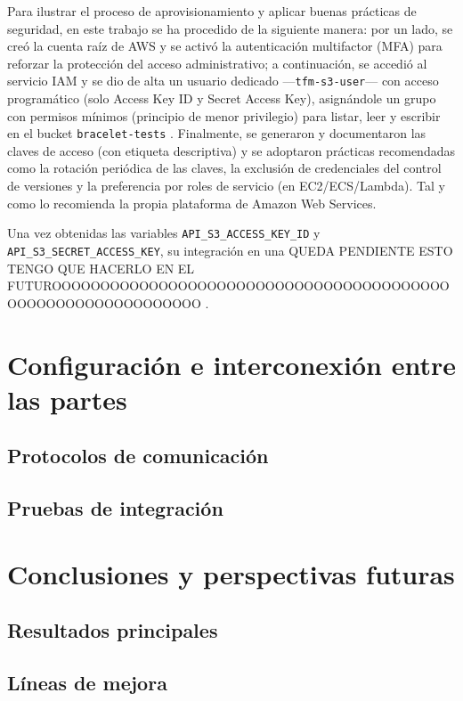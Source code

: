 \documentclass[12pt, a4paper]{article}
\begin{document}
	Para ilustrar el proceso de aprovisionamiento y aplicar buenas prácticas de seguridad, en este trabajo se ha procedido de la siguiente manera: por un lado, se creó la cuenta raíz de AWS y se activó la autenticación multifactor (MFA) para reforzar la protección del acceso administrativo; a continuación, se accedió al servicio IAM y se dio de alta un usuario dedicado —\texttt{tfm-s3-user}— con acceso programático (solo Access Key ID y Secret Access Key), asignándole un grupo con permisos mínimos (principio de menor privilegio) para listar, leer y escribir en el bucket \texttt{bracelet-tests} \cite{awsiam}. Finalmente, se generaron y documentaron las claves de acceso (con etiqueta descriptiva) y se adoptaron prácticas recomendadas como la rotación periódica de las claves, la exclusión de credenciales del control de versiones y la preferencia por roles de servicio (en EC2/ECS/Lambda). Tal y como lo recomienda la propia plataforma de Amazon Web Services.
	
	Una vez obtenidas las variables  
	\texttt{API\_S3\_ACCESS\_KEY\_ID} y  
	\texttt{API\_S3\_SECRET\_ACCESS\_KEY}, su integración en una QUEDA PENDIENTE ESTO TENGO QUE HACERLO EN EL FUTUROOOOOOOOOOOOOOOOOOOOOOOOOOOOOOOOOOOOOOOOOOOOOOOOOOOOOOOOOOOOO \cite{mhealth}.
	
\section{Configuración e interconexión entre las partes}
	\subsection{Protocolos de comunicación}
	\subsection{Pruebas de integración}

\section{Conclusiones y perspectivas futuras}
	\subsection{Resultados principales}
	\subsection{Líneas de mejora}
	
\end{document}
